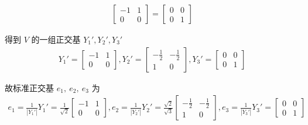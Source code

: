 \begin{solution}
\begin{enumerate}
\begin{align*}
\begin{bmatrix}
                                    -1 & 1 \\ 0 & 0
                                \end{bmatrix} = \begin{bmatrix}
                                    0 & 0 \\ 0 & 1
                                \end{bmatrix}
                            \end{align*}
                            \par 得到 $V$ 的一组正交基 $Y_1', Y_2', Y_3'$ 
                            \begin{align*}
                                Y_1' = \begin{bmatrix}
                                    -1 & 1 \\ 0 & 0
                                \end{bmatrix}, Y_2' = \begin{bmatrix}
                                    -\frac{1}{2} & -\frac{1}{2} \\ 1 & 0
                                \end{bmatrix}, Y_3' = \begin{bmatrix}
                                    0 & 0 \\ 0 & 1
                                \end{bmatrix}
                            \end{align*}
                            \par 故标准正交基 $e_1, \ e_2, \ e_3$ 为
                            \begin{align*}
                                e_1 = \frac{1}{|Y_1'|}Y_1' = \frac{1}{\sqrt{2}}\begin{bmatrix}
                                    -1 & 1 \\ 0 & 0
                                \end{bmatrix}, e_2 = \frac{1}{|Y_2'|}Y_2' = \frac{\sqrt{2}}{\sqrt{3}}\begin{bmatrix}
                                    -\frac{1}{2} & -\frac{1}{2} \\ 1 & 0
                                \end{bmatrix}, e_3 = \frac{1}{|Y_3'|}Y_3' = \begin{bmatrix}
                                    0 & 0 \\ 0 & 1
                                \end{bmatrix}

\end{align*}
\end{enumerate}
\end{solution}
